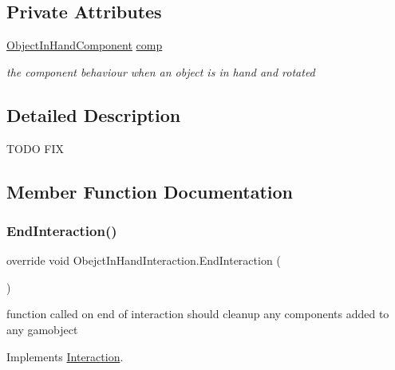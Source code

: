 \subsection*{Private Attributes}
\begin{DoxyCompactItemize}
\item 
\mbox{\hyperlink{class_object_in_hand_component}{Object\+In\+Hand\+Component}} \mbox{\hyperlink{class_obejct_in_hand_interaction_a3efd026997c61e49e9ffd3f26e1c80dd}{comp}}
\begin{DoxyCompactList}\small\item\em the component behaviour when an object is in hand and rotated \end{DoxyCompactList}\end{DoxyCompactItemize}


\subsection{Detailed Description}
T\+O\+DO F\+IX 



\subsection{Member Function Documentation}
\mbox{\label{class_obejct_in_hand_interaction_a67633fc3c21606d209e8e54db5c516a9}} 
\subsubsection{\texorpdfstring{End\+Interaction()}{EndInteraction()}}
{\footnotesize\ttfamily override void Obejct\+In\+Hand\+Interaction.\+End\+Interaction (\begin{DoxyParamCaption}{ }\end{DoxyParamCaption})\hspace{0.3cm}{\ttfamily [virtual]}}



function called on end of interaction should cleanup any components added to any gamobject 



Implements \mbox{\hyperlink{class_interaction_a13c7d99dbecf8e0d61973fd23de6400c}{Interaction}}.

